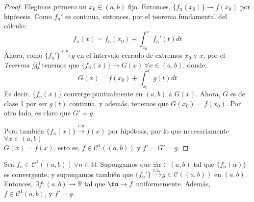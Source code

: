   \begin{proof}
    Elegimos primero un $x_0 \in (a,b)$ fijo. Entonces, $\{f_n(x_0)\} \to f(x_0)$ por hipótesis.
    Como $f_n'$ es continua, entonces, por el teorema fundamental del cálculo:
    \[
      f_n(x) = f_n(x_0) + \int_{x_0}^x f_n'(t)dt
    \]
    Ahora, como  $\{f_n'\} \xrightarrow{c.u.} g $ en el intervalo cerrado de extremos $x_0$ y $x$, por el \textit{Teorema \ref{4}} tenemos que $\{f_n(x)\} \to G(x)\ \forall x \in (a,b)$, donde:
    \[
      G(x) = f(x_0) + \int_{x_0}^x g(t)dt
    \]
    Es decir, $\{f_n(x)\}$ converge puntualmente en $(a,b)$ a $G(x)$. Ahora, $G$ es de clase 1 por ser $g(t)$ continua, y además, tenemos que $G(x_0) = f(x_0)$.
    Por otro lado, es claro que $G' = g$.

    Pero también $\{f_n(x)\} \xrightarrow {c.p} f(x)$ por hipótesis, por lo que necesariamente $\forall x \in (a,b)$ \\ $G(x) = f(x)$, esto es, $f \in \mathcal{C}^1((a,b))$ y $f' = G' = g$.
  \end{proof}

\begin{ncor}
  Sea $f_n\in \mathcal{C}^1((a,b)) \ \forall n \in \mathbb{N}$. Supongamos que $\exists \alpha \in (a,b)$ tal que $ \{f_n(\alpha)\}$ es convergente, y supongamos también que $\{f_n'\} \xrightarrow{c.u.} g \in \mathcal C((a,b))$ en $(a,b)$. Entonces, $\exists f: (a,b) \to \mathbb{R}$ tal que $\fn \to f$ uniformemente. Además, $f \in \mathcal{C}^1(a,b)$, y  $f' = g$.
\end{ncor}

